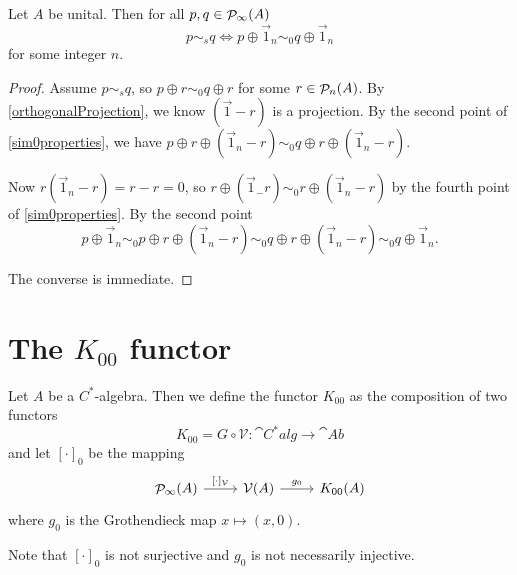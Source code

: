 \begin{lemma} \label{stableEquivalence}
Let $A$ be unital. Then for all $p,q\in\mathop{\mathcal{P}}\nolimits_\infty(A)$
\[ p\sim_s q \iff p\oplus \vec{1}_n \sim_0 q\oplus \vec{1}_n \]
for some integer $n$.
\end{lemma}
\begin{proof}
Assume $ p\sim_s q$, so $p\oplus r \sim_0 q\oplus r$ for some $r\in\mathop{\mathcal{P}}\nolimits_n(A)$. By \ref{orthogonalProjection}, we know $(\vec{1}-r)$ is a projection. By the second point of \ref{sim0properties}, we have $p\oplus r \oplus (\vec{1}_n - r) \sim_0 q\oplus r \oplus (\vec{1}_n - r)$.

Now $r(\vec{1}_n - r) = r-r = 0$, so $r\oplus(\vec{1}_ - r) \sim_0 r\oplus(\vec{1}_n - r)$ by the fourth point of \ref{sim0properties}. By the second point
\[ p\oplus \vec{1}_n \sim_0 p\oplus r \oplus (\vec{1}_n - r) \sim_0 q\oplus r \oplus (\vec{1}_n - r) \sim_0 q\oplus \vec{1}_n. \]

The converse is immediate.
\end{proof}

\section{The $K_{00}$ functor}
\begin{definition}
Let $A$ be a $C^*$-algebra. Then we define the functor $K_{00}$ as the composition of two functors
\[ K_{00} = G \circ \mathcal{V}: \cat{C^*alg} \to \cat{Ab} \]
and let $[\cdot]_{0}$ be the mapping
\[ \begin{tikzcd}
\Projections_\infty(A) \rar["{[\cdot]_\mathcal{V}}"] & \mathcal{V}(A) \rar["g_0"] & K_{00}(A)
\end{tikzcd} \]
where $g_0$ is the Grothendieck map $x\mapsto (x,0)$.
\end{definition}
Note that $[\cdot]_{0}$ is not surjective and $g_0$ is not necessarily injective.


